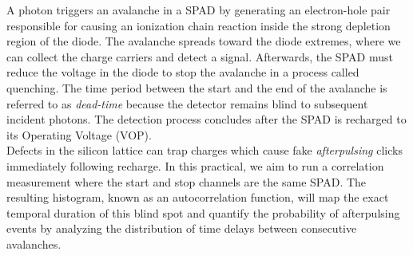 A photon triggers an avalanche in a SPAD by generating an electron-hole pair responsible for causing an ionization chain reaction inside the strong depletion region of the diode. 
The avalanche spreads toward the diode extremes, where we can collect the charge carriers and detect a signal. 
Afterwards, the SPAD must reduce the voltage in the diode to stop the avalanche in a process called quenching. 
The time period between the start and the end of the avalanche is referred to as \textit{dead-time} because the detector remains blind to subsequent incident photons. 
The detection process concludes after the SPAD is recharged to its Operating Voltage (VOP).\\

Defects in the silicon lattice can trap charges which cause fake \textit{afterpulsing} clicks immediately following recharge. 
In this practical, we aim to run a correlation measurement where the start and stop channels are the same SPAD. 
The resulting histogram, known as an autocorrelation function, will map the exact temporal duration of this blind spot 
and quantify the probability of afterpulsing events by analyzing the distribution of time delays between consecutive avalanches.